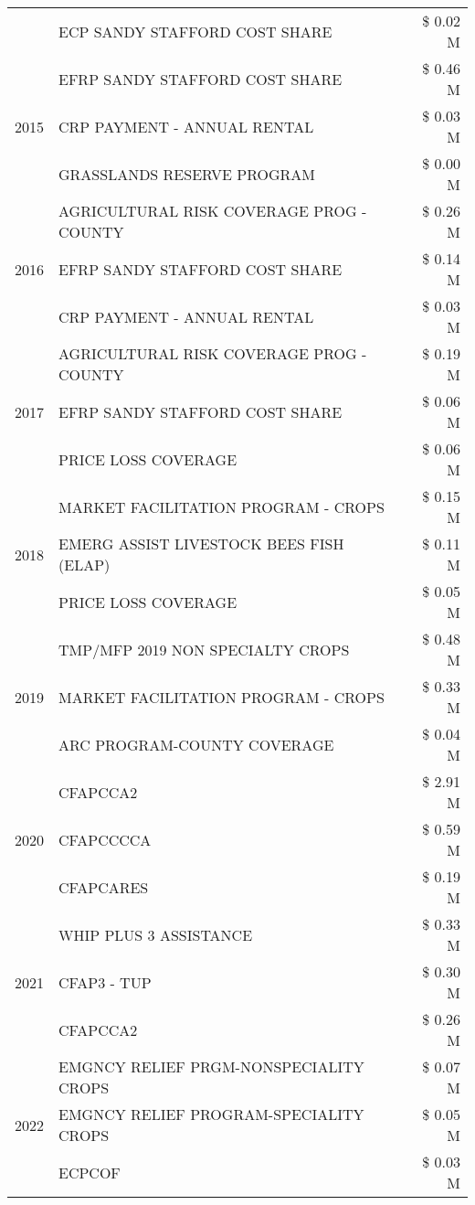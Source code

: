 \begin{tabular}{llr}
 & ECP SANDY STAFFORD COST SHARE & \$ 0.02 M \\
\cline{1-3}
\multirow[t]{3}{*}{2015} & EFRP SANDY STAFFORD COST SHARE & \$ 0.46 M \\
 & CRP PAYMENT - ANNUAL RENTAL & \$ 0.03 M \\
 & GRASSLANDS RESERVE PROGRAM & \$ 0.00 M \\
\cline{1-3}
\multirow[t]{3}{*}{2016} & AGRICULTURAL RISK COVERAGE PROG - COUNTY & \$ 0.26 M \\
 & EFRP SANDY STAFFORD COST SHARE & \$ 0.14 M \\
 & CRP PAYMENT - ANNUAL RENTAL & \$ 0.03 M \\
\cline{1-3}
\multirow[t]{3}{*}{2017} & AGRICULTURAL RISK COVERAGE PROG - COUNTY & \$ 0.19 M \\
 & EFRP SANDY STAFFORD COST SHARE & \$ 0.06 M \\
 & PRICE LOSS COVERAGE & \$ 0.06 M \\
\cline{1-3}
\multirow[t]{3}{*}{2018} & MARKET FACILITATION PROGRAM - CROPS & \$ 0.15 M \\
 & EMERG ASSIST LIVESTOCK BEES FISH (ELAP) & \$ 0.11 M \\
 & PRICE LOSS COVERAGE & \$ 0.05 M \\
\cline{1-3}
\multirow[t]{3}{*}{2019} & TMP/MFP 2019 NON SPECIALTY CROPS & \$ 0.48 M \\
 & MARKET FACILITATION PROGRAM - CROPS & \$ 0.33 M \\
 & ARC PROGRAM-COUNTY COVERAGE & \$ 0.04 M \\
\cline{1-3}
\multirow[t]{3}{*}{2020} & CFAPCCA2 & \$ 2.91 M \\
 & CFAPCCCCA & \$ 0.59 M \\
 & CFAPCARES & \$ 0.19 M \\
\cline{1-3}
\multirow[t]{3}{*}{2021} & WHIP PLUS 3 ASSISTANCE & \$ 0.33 M \\
 & CFAP3 - TUP & \$ 0.30 M \\
 & CFAPCCA2 & \$ 0.26 M \\
\cline{1-3}
\multirow[t]{3}{*}{2022} & EMGNCY RELIEF PRGM-NONSPECIALITY CROPS & \$ 0.07 M \\
 & EMGNCY RELIEF PROGRAM-SPECIALITY CROPS & \$ 0.05 M \\
 & ECPCOF & \$ 0.03 M \\
\cline{1-3}
\bottomrule
\end{tabular}
